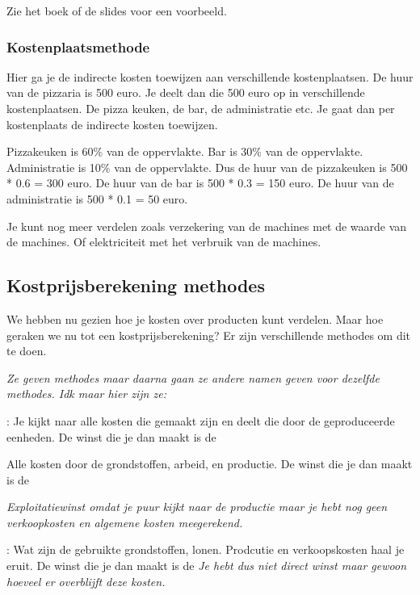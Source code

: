 \documentclass[a4paper,11pt]{article}
\begin{document}
Zie het boek of de slides voor een voorbeeld.


\subsubsection{Kostenplaatsmethode}
Hier ga je de indirecte kosten toewijzen aan verschillende kostenplaatsen.
De huur van de pizzaria is 500 euro.
Je deelt dan die 500 euro op in verschillende kostenplaatsen.
De pizza keuken, de bar, de administratie etc.
Je gaat dan per kostenplaats de indirecte kosten toewijzen.

Pizzakeuken is 60\% van de oppervlakte.
Bar is 30\% van de oppervlakte.
Administratie is 10\% van de oppervlakte.
\newline
Dus de huur van de pizzakeuken is 500 * 0.6 = 300 euro.
De huur van de bar is 500 * 0.3 = 150 euro.
De huur van de administratie is 500 * 0.1 = 50 euro.
\newline

Je kunt nog meer verdelen zoals verzekering van de machines met de waarde 
van de machines.
Of elektriciteit met het verbruik van de machines.
\newline


\subsection{Kostprijsberekening methodes}
We hebben nu gezien hoe je kosten over producten kunt verdelen.
Maar hoe geraken we nu tot een kostprijsberekening?
Er zijn verschillende methodes om dit te doen.
\newline 

\textit{Ze geven methodes maar daarna gaan ze andere namen geven voor
dezelfde methodes. Idk maar hier zijn ze:}
\begin{description}
    \item {}: Je kijkt naar
    alle kosten die gemaakt zijn en deelt die door de geproduceerde eenheden.
    De winst die je dan maakt is de 
    \item {}
    Alle kosten door de grondstoffen, arbeid, en productie.
    De winst die je dan maakt is de 

    \textit{Exploitatiewinst omdat je puur kijkt naar de productie maar je hebt nog geen verkoopkosten en 
    algemene kosten meegerekend.}
    \item {}:
    Wat zijn de gebruikte grondstoffen, lonen. Prodcutie 
    en verkoopskosten haal je eruit. 
    De winst die je dan maakt is de 
    \textit{Je hebt dus niet direct winst maar gewoon hoeveel er overblijft deze kosten.}
    
\end{description}
\end{document}
